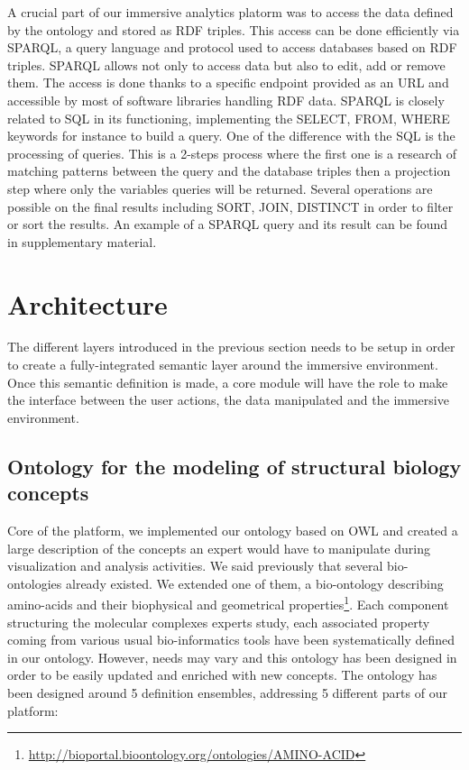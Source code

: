 \documentclass{vgtc}                          %
\begin{document}
A crucial part of our immersive analytics platorm was to access the data defined by the ontology and stored as RDF triples. This access can be done efficiently via SPARQL, a query language and protocol used to access databases based on RDF triples. SPARQL allows not only to access data but also to edit, add or remove them. The access is done thanks to a specific endpoint provided as an URL and accessible by most of software libraries handling RDF data. SPARQL is closely related to SQL in its functioning, implementing the SELECT, FROM, WHERE keywords for instance to build a query. One of the difference with the SQL is the processing of queries. This is a 2-steps process where the first one is a research of matching patterns between the query and the database triples then a projection step where only the variables queries will be returned. Several operations are possible on the final results including SORT, JOIN, DISTINCT in order to filter or sort the results. An example of a SPARQL query and its result can be found in supplementary material.

\section{Architecture}

The different layers introduced in the previous section needs to be setup in order to create a fully-integrated semantic layer around the immersive environment. Once this semantic definition is made, a core module will have the role to make the interface between the user actions, the data manipulated and the immersive environment.

\subsection{Ontology for the modeling of structural biology concepts}

Core of the platform, we implemented our ontology based on OWL and created a large description of the concepts an expert would have to manipulate during visualization and analysis activities. We said previously that several bio-ontologies already existed. We extended one of them, a bio-ontology describing amino-acids and their biophysical and geometrical properties\footnote{\url{http://bioportal.bioontology.org/ontologies/AMINO-ACID}}.
Each component structuring the molecular complexes experts study, each associated property coming from various usual bio-informatics tools have been systematically defined in our ontology. However, needs may vary and this ontology has been designed in order to be easily updated and enriched with new concepts.
The ontology has been designed around 5 definition ensembles, addressing 5 different parts of our platform:
\end{document}

